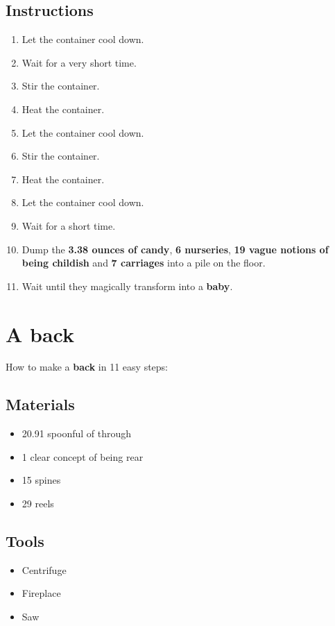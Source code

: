 \documentclass{article}
\begin{document}
\subsection{Instructions}\begin{enumerate}
\item 
Let the container cool down.
\item 
Wait for a very short time.
\item 
Stir the container.
\item 
Heat the container.
\item 
Let the container cool down.
\item 
Stir the container.
\item 
Heat the container.
\item 
Let the container cool down.
\item 
Wait for a short time.
\item 
Dump the \textbf{3.38 ounces of candy}, \textbf{6 nurseries}, \textbf{19 vague notions of being childish} and \textbf{7 carriages} into a pile on the floor.
\item 
Wait until they magically transform into a \textbf{baby}.
\end{enumerate}
\newpage
\section{A back}How to make a \textbf{back} in 11 easy steps:

\subsection{Materials}\begin{itemize}
\item 
20.91 spoonful of through
\item 
1 clear concept of being rear
\item 
15 spines
\item 
29 reels
\end{itemize}
\subsection{Tools}\begin{itemize}
\item 
Centrifuge
\item 
Fireplace
\item 
Saw
\end{itemize}
\end{document}
